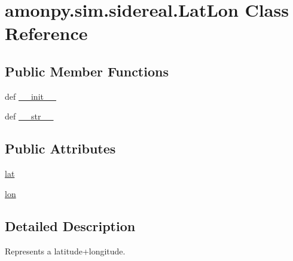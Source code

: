 \hypertarget{classamonpy_1_1sim_1_1sidereal_1_1_lat_lon}{\section{amonpy.\-sim.\-sidereal.\-Lat\-Lon Class Reference}
\label{classamonpy_1_1sim_1_1sidereal_1_1_lat_lon}
}
\subsection*{Public Member Functions}
\begin{DoxyCompactItemize}
\item 
def \hyperlink{classamonpy_1_1sim_1_1sidereal_1_1_lat_lon_a73f11744f2cadc214465aa00d475d667}{\-\_\-\-\_\-init\-\_\-\-\_\-}
\item 
def \hyperlink{classamonpy_1_1sim_1_1sidereal_1_1_lat_lon_ab6e372ef13cbd6713d875d015ed10812}{\-\_\-\-\_\-str\-\_\-\-\_\-}
\end{DoxyCompactItemize}
\subsection*{Public Attributes}
\begin{DoxyCompactItemize}
\item 
\hyperlink{classamonpy_1_1sim_1_1sidereal_1_1_lat_lon_a0e2c9402d3ac86eb39a9d1665af225b1}{lat}
\item 
\hyperlink{classamonpy_1_1sim_1_1sidereal_1_1_lat_lon_a9ee8ebd4f37cfe0431ed461eb9f3fdc9}{lon}
\end{DoxyCompactItemize}


\subsection{Detailed Description}
\begin{DoxyVerb}Represents a latitude+longitude.
\end{DoxyVerb}
 

